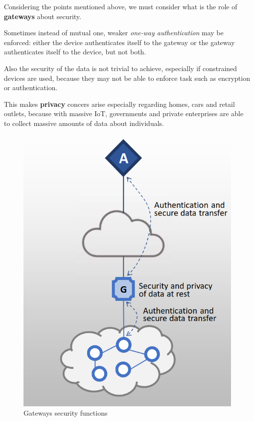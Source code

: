 \begin{paracol}{2}
   Considering the points mentioned above, we must consider what is the role of \textbf{gateways} about security.

   Sometimes instead of mutual one, weaker \textit{one-way authentication} may be enforced:
   either the device authenticates itself to the gateway or
   the gateway authenticates itself to the device,
   but not both.
   
   Also the security of the data is not trivial to achieve, especially if constrained devices are used, because they may not be able to enforce task such as encryption or authentication.
   
   This makes \textbf{privacy} concers arise especially regarding homes, cars and retail outlets, because with massive IoT, governments and private enterprises
   are able to collect massive amounts of data about individuals.
   \switchcolumn

   \begin{figure}[htbp]
      \centering
      \includegraphics{images/gateways_security.png}
      \caption{Gateways security functions}
      \label{fig:gateways_security}
   \end{figure}
\end{paracol}
